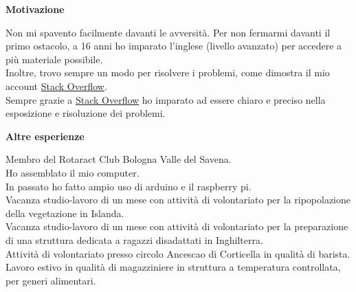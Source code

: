 \documentclass[a4paper,12pt,final]{memoir}
\newcommand{\Sep}{\vspace{1.5em}}
\newcommand{\SmallSep}{\vspace{0.5em}}
\newcommand{\CVSection}[1]
	{\Large\textbf{#1}\par
	\SmallSep\normalsize\normalfont}
\begin{document}
\CVSection{Motivazione}
	Non mi spavento facilmente davanti le avversità.
	Per non fermarmi davanti il primo ostacolo, a 16 anni ho imparato l'inglese (livello avanzato) per accedere a più materiale possibile.
	\\Inoltre, trovo sempre un modo per risolvere i problemi, come dimostra il mio account \href{https://stackoverflow.com/users/6875945/mattia-rubini}{Stack Overflow}.
	\\Sempre grazie a \href{https://stackoverflow.com/users/6875945/mattia-rubini}{Stack Overflow} ho imparato ad essere chiaro e preciso nella esposizione e risoluzione dei problemi.

\CVSection{Altre esperienze}
	Membro del Rotaract Club Bologna Valle del Savena.
	\\Ho assemblato il mio computer.
	\\In passato ho fatto ampio uso di arduino e il raspberry pi.
	\\Vacanza studio-lavoro di un mese con attività di volontariato per la ripopolazione della vegetazione in Islanda.
	\\Vacanza studio-lavoro di un mese con attività di volontariato per la preparazione di una struttura dedicata a ragazzi disadattati in Inghilterra.
	\\Attività di volontariato presso circolo Ancescao di Corticella in qualità di barista.
	\\Lavoro estivo in qualità di magazziniere in struttura a temperatura controllata, per generi alimentari.
\Sep


\end{document}
